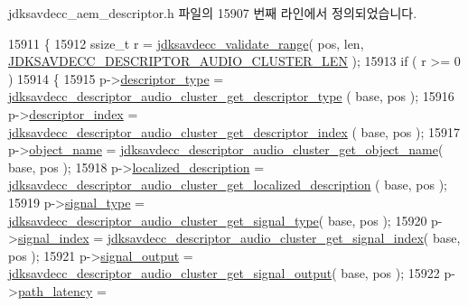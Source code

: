 jdksavdecc\+\_\+aem\+\_\+descriptor.\+h 파일의 15907 번째 라인에서 정의되었습니다.


\begin{DoxyCode}
15911 \{
15912     ssize\_t r = \hyperlink{group__util_ga9c02bdfe76c69163647c3196db7a73a1}{jdksavdecc\_validate\_range}( pos, len, 
      \hyperlink{group__descriptor__audio__cluster_ga1773710c3cbdaea84a913083b3be2fbb}{JDKSAVDECC\_DESCRIPTOR\_AUDIO\_CLUSTER\_LEN} );
15913     \textcolor{keywordflow}{if} ( r >= 0 )
15914     \{
15915         p->\hyperlink{structjdksavdecc__descriptor__audio__cluster_ab7c32b6c7131c13d4ea3b7ee2f09b78d}{descriptor\_type} = 
      \hyperlink{group__descriptor__audio__cluster_ga161ef88a3a0096712e7ae2c7785c68c4}{jdksavdecc\_descriptor\_audio\_cluster\_get\_descriptor\_type}
      ( base, pos );
15916         p->\hyperlink{structjdksavdecc__descriptor__audio__cluster_a042bbc76d835b82d27c1932431ee38d4}{descriptor\_index} = 
      \hyperlink{group__descriptor__audio__cluster_gac54877ae34c9b9eadb80dd19e0ee1d57}{jdksavdecc\_descriptor\_audio\_cluster\_get\_descriptor\_index}
      ( base, pos );
15917         p->\hyperlink{structjdksavdecc__descriptor__audio__cluster_a7d1f5945a13863b1762fc6db74fa8f80}{object\_name} = 
      \hyperlink{group__descriptor__audio__cluster_ga5292c49cab71af6d076e8eecfdb892cf}{jdksavdecc\_descriptor\_audio\_cluster\_get\_object\_name}( 
      base, pos );
15918         p->\hyperlink{structjdksavdecc__descriptor__audio__cluster_a0926f846ca65a83ad5bb06b4aff8f408}{localized\_description} = 
      \hyperlink{group__descriptor__audio__cluster_gaa9858a53010cd564ac25a9a31f232496}{jdksavdecc\_descriptor\_audio\_cluster\_get\_localized\_description}
      ( base, pos );
15919         p->\hyperlink{structjdksavdecc__descriptor__audio__cluster_a248e60ef99d5ed1779989d1dd6b6dc5a}{signal\_type} = 
      \hyperlink{group__descriptor__audio__cluster_ga76d46b9ee4647320d0c7728e45ef657c}{jdksavdecc\_descriptor\_audio\_cluster\_get\_signal\_type}( 
      base, pos );
15920         p->\hyperlink{structjdksavdecc__descriptor__audio__cluster_ae2e81a95ee9ad83f1fe22b6a1ee29075}{signal\_index} = 
      \hyperlink{group__descriptor__audio__cluster_ga515d1b65fae4a1cb18ab21df215c669b}{jdksavdecc\_descriptor\_audio\_cluster\_get\_signal\_index}( 
      base, pos );
15921         p->\hyperlink{structjdksavdecc__descriptor__audio__cluster_ab4b91864e6fc335d7e86536d9f4461e4}{signal\_output} = 
      \hyperlink{group__descriptor__audio__cluster_ga261ce66a86f378302588a63e545b045b}{jdksavdecc\_descriptor\_audio\_cluster\_get\_signal\_output}(
       base, pos );
15922         p->\hyperlink{structjdksavdecc__descriptor__audio__cluster_a5527ea1fa3f885e9d2264e450e1635fa}{path\_latency} = 

\end{DoxyCode}
